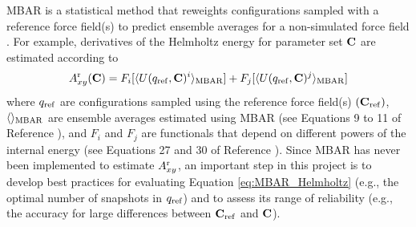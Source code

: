 \documentclass[12pt,a4paper]{article}
\newcommand{\bfm}[1]{{\bf #1}}
\newcommand{\C}{\bfm{C}}
\begin{document}

MBAR is a statistical method that reweights configurations sampled with a reference force field(s) to predict ensemble averages for a non-simulated force field \cite{shirts-chodera:jcp:2008:mbar,Messerly2018_1}. For example, derivatives of the Helmholtz energy for parameter set $\C$ are estimated according to 
\begin{equation} \label{eq:MBAR_Helmholtz}
A_{xy}^{\rm r}(\C) = F_i[\langle U(q_{\rm ref},\C)^i \rangle_{\rm MBAR}] + F_j[\langle U(q_{\rm ref},\C)^j \rangle_{\rm MBAR}]
\end{equation}
where $q_{\rm ref}$ are configurations sampled using the reference force field(s) $(\C_{\rm ref})$, $\langle\rangle_{\rm MBAR}$ are ensemble averages estimated using MBAR (see Equations 9 to 11 of Reference ), and $F_i$ and $F_j$ are functionals that depend on different powers of the internal energy (see Equations 27 and 30 of Reference ). Since MBAR has never been implemented to estimate $A_{xy}^{\rm r}$, an important step in this project is to develop best practices for evaluating Equation \ref{eq:MBAR_Helmholtz} (e.g., the optimal number of snapshots in $q_{\rm ref}$) and to assess its range of reliability (e.g., the accuracy for large differences between $\C_{\rm ref}$ and $\C$). 

\end{document}
